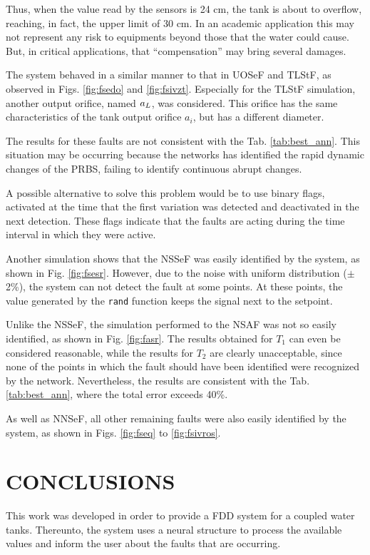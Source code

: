 \documentclass[10pt,fleqn,a4paper]{article}
\begin{document}
Thus, when the value read by the sensors is 24 cm, the tank is about to
overflow, reaching, in fact, the upper limit of 30 cm. In an academic
application this may not represent any risk to equipments beyond those that
the water could cause. But, in critical applications, that ``compensation''
may bring several damages.

The system behaved in a similar manner to that in UOSeF and TLStF, as observed
in Figs. \ref{fig:fsedo} and \ref{fig:fsivzt}. Especially for the TLStF
simulation, another output orifice, named $a_{\tiny L}$, was considered. This
orifice has the same characteristics of the tank output orifice $a_i$, but has a
different diameter.

The results for these faults are not consistent with the Tab.
\ref{tab:best_ann}. This situation may be occurring because the networks has
identified the rapid dynamic changes of the PRBS, failing to identify continuous
abrupt changes.

A possible alternative to solve this problem would be to use binary flags,
activated at the time that the first variation was detected and deactivated in
the next detection. These flags indicate that the faults are acting during the
time interval in which they were active.

Another simulation shows that the NSSeF was easily identified by the system, as
shown in Fig. \ref{fig:fsesr}. However, due to the noise with uniform
distribution ($\pm$2\%), the system can not detect the fault at some points. At
these points, the value generated by the {\tt rand} function keeps the signal
next to the setpoint.

Unlike the NSSeF, the simulation performed to the NSAF was not so easily
identified, as shown in Fig. \ref{fig:fasr}. The results obtained for $T_1$ can
even be considered reasonable, while the results for $T_2$ are clearly
unacceptable, since none of the points in which the fault should have been
identified were recognized by the network. Nevertheless, the results are
consistent with the Tab. \ref{tab:best_ann}, where the total error exceeds 40\%.

As well as NNSeF, all other remaining faults were also easily identified by the
system, as shown in Figs. \ref{fig:fseq} to \ref{fig:fsivros}.

\section{CONCLUSIONS}\label{sec:conclusions}
This work was developed in order to provide a FDD system for a coupled water
tanks. Thereunto, the system uses a neural structure to process the available
values and inform the user about the faults that are occurring.
\end{document}
